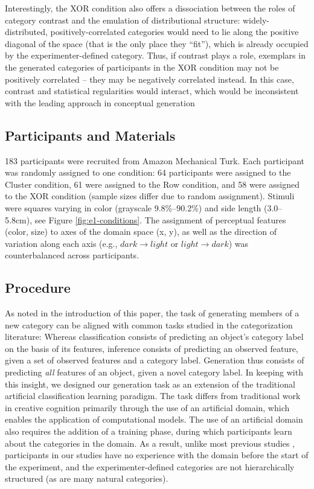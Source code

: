 \documentclass[12pt]{article}
\begin{document}
\begin{flushleft}
Interestingly, the XOR condition also offers a dissociation between the roles of category contrast and the emulation of distributional structure: widely-distributed, positively-correlated categories would need to lie along the positive diagonal of the space (that is the only place they ``fit''), which is already occupied by the experimenter-defined category. Thus, if contrast plays a role, exemplars in the generated categories of participants in the XOR condition may not be positively correlated -- they may be negatively correlated instead. In this case, contrast and statistical regularities would interact, which would be inconsistent with the leading approach in conceptual generation \citep{jern2013probabilistic}


\subsection{Participants and Materials}

183 participants were recruited from Amazon Mechanical Turk. Each participant was randomly assigned to one condition: 64 participants were assigned to the Cluster condition, 61 were assigned to the Row condition, and 58 were assigned to the XOR condition (sample sizes differ due to random assignment). Stimuli were squares varying in color (grayscale 9.8\%--90.2\%) and side length (3.0--5.8cm), see Figure \ref{fig:e1-conditions}. The assignment of perceptual features (color, size) to axes of the domain space (x, y), as well as the direction of variation along each axis (e.g., $dark \rightarrow light$ or $light \rightarrow dark$) was counterbalanced across participants.

\subsection{Procedure}

As noted in the introduction of this paper, the task of generating members of a new category can be aligned with common tasks studied in the categorization literature: Whereas classification consists of predicting an object's category label on the basis of its features, inference consists of predicting an observed feature, given a set of observed features and a category label. Generation thus consists of predicting {\em all} features of an object, given a novel category label. In keeping with this insight, we designed our generation task as an extension of the traditional artificial classification learning paradigm. The task differs from traditional work in creative cognition primarily through the use of an artificial domain, which enables the application of computational models. The use of an artificial domain also requires the addition of a training phase, during which participants learn about the categories in the domain. As a result, unlike most previous studies \citep[e.g.,][]{ward1994structured}, participants in our studies have no experience with the domain before the start of the experiment, and the experimenter-defined categories are not hierarchically structured (as are many natural categories).


\end{flushleft}
\end{document}
